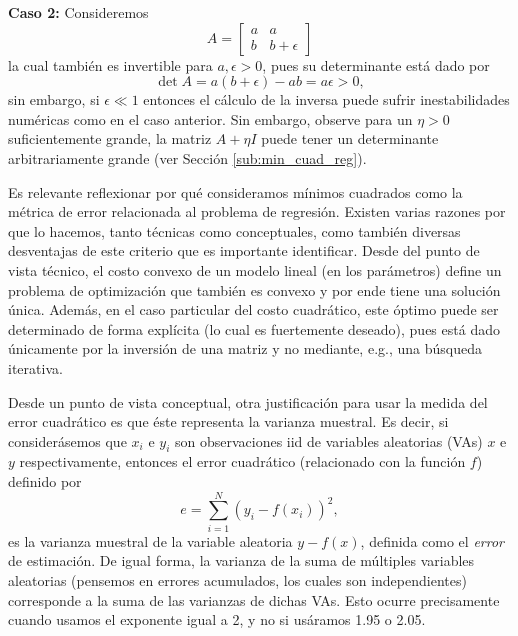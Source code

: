 \begin{mdframed}[style=discusion, frametitle={\center ¿Matriz cuasi-singular o incorrectamente escalada?}]
\noindent\textbf{Caso 2:} Consideremos
\begin{equation}
	A = \left[ \begin{matrix} a  & a \\  b  & b + \epsilon\end{matrix}\right]
\end{equation}
la cual también es invertible para $a,\epsilon>0$, pues su determinante está dado por
\begin{equation}
	\det{A} = a(b+\epsilon) - ab = a\epsilon>0,
\end{equation}
sin embargo, si $\epsilon\ll1$ entonces el cálculo de la inversa puede sufrir inestabilidades numéricas como en el caso anterior. Sin embargo, observe para un $\eta>0$ suficientemente grande, la matriz $A+\eta I$ puede tener un determinante arbitrariamente grande (ver Sección \ref{sub:min_cuad_reg}).
\end{mdframed}

Es relevante reflexionar por qué consideramos mínimos cuadrados como la métrica de error relacionada al problema de regresión. Existen varias razones por que lo hacemos, tanto técnicas como conceptuales, como también diversas desventajas de este criterio que es importante identificar.  Desde del punto de vista técnico, el costo convexo de un modelo lineal (en los parámetros) define un problema de optimización que también es convexo y por ende tiene una solución única. Además, en el caso particular del costo cuadrático, este óptimo puede ser determinado de forma explícita (lo cual es fuertemente deseado), pues está dado únicamente por la inversión de una matriz y no mediante, e.g., una búsqueda iterativa.

Desde un punto de vista conceptual, otra justificación para usar la medida del  error cuadrático es que éste representa la varianza muestral. Es decir, si considerásemos que $x_i$ e $y_i$ son observaciones iid de variables aleatorias (VAs) $x$ e $y$ respectivamente, entonces el error cuadrático (relacionado con la función $f$) definido por
\begin{equation}
	e= \sum_{i=1}^N (y_i-f(x_i))^2,
\end{equation}
es la varianza muestral de la variable aleatoria $y-f(x)$, definida como el \emph{error} de estimación. De igual forma, la varianza de la suma de múltiples variables aleatorias (pensemos en errores acumulados, los cuales son independientes) corresponde a la suma de las varianzas de dichas VAs. Esto ocurre precisamente cuando usamos el exponente igual a 2, y no si usáramos 1.95 o 2.05. 


